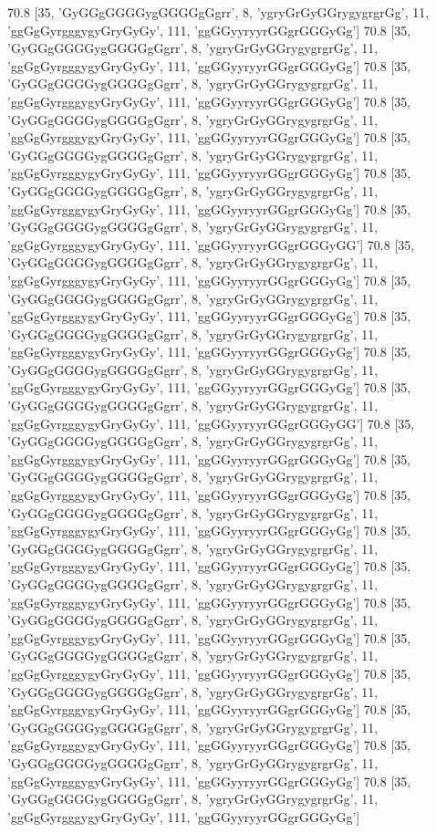 70.8 [35, 'GyGGgGGGGygGGGGgGgrr', 8, 'ygryGrGyGGrygygrgrGg', 11, 'ggGgGyrgggygyGryGyGy', 111, 'ggGGyyryyrGGgrGGGyGg']
70.8 [35, 'GyGGgGGGGygGGGGgGgrr', 8, 'ygryGrGyGGrygygrgrGg', 11, 'ggGgGyrgggygyGryGyGy', 111, 'ggGGyyryyrGGgrGGGyGg']
70.8 [35, 'GyGGgGGGGygGGGGgGgrr', 8, 'ygryGrGyGGrygygrgrGg', 11, 'ggGgGyrgggygyGryGyGy', 111, 'ggGGyyryyrGGgrGGGyGg']
70.8 [35, 'GyGGgGGGGygGGGGgGgrr', 8, 'ygryGrGyGGrygygrgrGg', 11, 'ggGgGyrgggygyGryGyGy', 111, 'ggGGyyryyrGGgrGGGyGg']
70.8 [35, 'GyGGgGGGGygGGGGgGgrr', 8, 'ygryGrGyGGrygygrgrGg', 11, 'ggGgGyrgggygyGryGyGy', 111, 'ggGGyyryyrGGgrGGGyGg']
70.8 [35, 'GyGGgGGGGygGGGGgGgrr', 8, 'ygryGrGyGGrygygrgrGg', 11, 'ggGgGyrgggygyGryGyGy', 111, 'ggGGyyryyrGGgrGGGyGg']
70.8 [35, 'GyGGgGGGGygGGGGgGgrr', 8, 'ygryGrGyGGrygygrgrGg', 11, 'ggGgGyrgggygyGryGyGy', 111, 'ggGGyyryyrGGgrGGGyGG']
70.8 [35, 'GyGGgGGGGygGGGGgGgrr', 8, 'ygryGrGyGGrygygrgrGg', 11, 'ggGgGyrgggygyGryGyGy', 111, 'ggGGyyryyrGGgrGGGyGg']
70.8 [35, 'GyGGgGGGGygGGGGgGgrr', 8, 'ygryGrGyGGrygygrgrGg', 11, 'ggGgGyrgggygyGryGyGy', 111, 'ggGGyyryyrGGgrGGGyGg']
70.8 [35, 'GyGGgGGGGygGGGGgGgrr', 8, 'ygryGrGyGGrygygrgrGg', 11, 'ggGgGyrgggygyGryGyGy', 111, 'ggGGyyryyrGGgrGGGyGg']
70.8 [35, 'GyGGgGGGGygGGGGgGgrr', 8, 'ygryGrGyGGrygygrgrGg', 11, 'ggGgGyrgggygyGryGyGy', 111, 'ggGGyyryyrGGgrGGGyGg']
70.8 [35, 'GyGGgGGGGygGGGGgGgrr', 8, 'ygryGrGyGGrygygrgrGg', 11, 'ggGgGyrgggygyGryGyGy', 111, 'ggGGyyryyrGGgrGGGyGG']
70.8 [35, 'GyGGgGGGGygGGGGgGgrr', 8, 'ygryGrGyGGrygygrgrGg', 11, 'ggGgGyrgggygyGryGyGy', 111, 'ggGGyyryyrGGgrGGGyGg']
70.8 [35, 'GyGGgGGGGygGGGGgGgrr', 8, 'ygryGrGyGGrygygrgrGg', 11, 'ggGgGyrgggygyGryGyGy', 111, 'ggGGyyryyrGGgrGGGyGg']
70.8 [35, 'GyGGgGGGGygGGGGgGgrr', 8, 'ygryGrGyGGrygygrgrGg', 11, 'ggGgGyrgggygyGryGyGy', 111, 'ggGGyyryyrGGgrGGGyGg']
70.8 [35, 'GyGGgGGGGygGGGGgGgrr', 8, 'ygryGrGyGGrygygrgrGg', 11, 'ggGgGyrgggygyGryGyGy', 111, 'ggGGyyryyrGGgrGGGyGg']
70.8 [35, 'GyGGgGGGGygGGGGgGgrr', 8, 'ygryGrGyGGrygygrgrGg', 11, 'ggGgGyrgggygyGryGyGy', 111, 'ggGGyyryyrGGgrGGGyGg']
70.8 [35, 'GyGGgGGGGygGGGGgGgrr', 8, 'ygryGrGyGGrygygrgrGg', 11, 'ggGgGyrgggygyGryGyGy', 111, 'ggGGyyryyrGGgrGGGyGg']
70.8 [35, 'GyGGgGGGGygGGGGgGgrr', 8, 'ygryGrGyGGrygygrgrGg', 11, 'ggGgGyrgggygyGryGyGy', 111, 'ggGGyyryyrGGgrGGGyGg']
70.8 [35, 'GyGGgGGGGygGGGGgGgrr', 8, 'ygryGrGyGGrygygrgrGg', 11, 'ggGgGyrgggygyGryGyGy', 111, 'ggGGyyryyrGGgrGGGyGg']
70.8 [35, 'GyGGgGGGGygGGGGgGgrr', 8, 'ygryGrGyGGrygygrgrGg', 11, 'ggGgGyrgggygyGryGyGy', 111, 'ggGGyyryyrGGgrGGGyGg']
70.8 [35, 'GyGGgGGGGygGGGGgGgrr', 8, 'ygryGrGyGGrygygrgrGg', 11, 'ggGgGyrgggygyGryGyGy', 111, 'ggGGyyryyrGGgrGGGyGg']
70.8 [35, 'GyGGgGGGGygGGGGgGgrr', 8, 'ygryGrGyGGrygygrgrGg', 11, 'ggGgGyrgggygyGryGyGy', 111, 'ggGGyyryyrGGgrGGGyGg']
